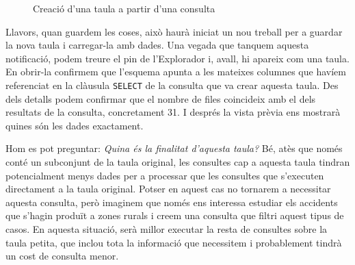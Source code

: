 \documentclass[12pt,longbibliography]{article}
\theoremstyle{definition}
\theoremstyle{remark}
\begin{document}
\begin{figure}[h!]
\par
{}%
\hfill
{}%
\par

\caption{Creació d'una taula a partir d'una consulta}
\label{fig:bq17}
\end{figure}



Llavors, quan guardem les coses, això haurà iniciat un nou treball per a guardar la nova taula i carregar-la amb dades. Una vegada que tanquem aquesta notificació, podem treure el pin de l'Explorador i, avall, hi apareix com una taula. En obrir-la confirmem que l'esquema apunta a les mateixes columnes que havíem referenciat en la clàusula \verb|SELECT| de la consulta que va crear aquesta taula. Des dels detalls podem confirmar que el nombre de files coincideix amb el dels resultats de la consulta, concretament 31. I després la vista prèvia ens mostrarà quines són les dades exactament. 



Hom es pot preguntar: \textit{Quina és la finalitat d'aquesta taula?} Bé, atès que només conté un subconjunt de la taula original, les consultes cap a aquesta taula tindran potencialment menys dades per a processar que les consultes que s'executen directament a la taula original. Potser en aquest cas no tornarem a necessitar aquesta consulta, però imaginem que només ens interessa estudiar els accidents que s'hagin produït a zones rurals i creem una consulta que filtri aquest tipus de casos. En aquesta situació, serà millor executar la resta de consultes sobre la taula petita, que inclou tota la informació que necessitem i probablement tindrà un cost de consulta menor.
\end{document}
